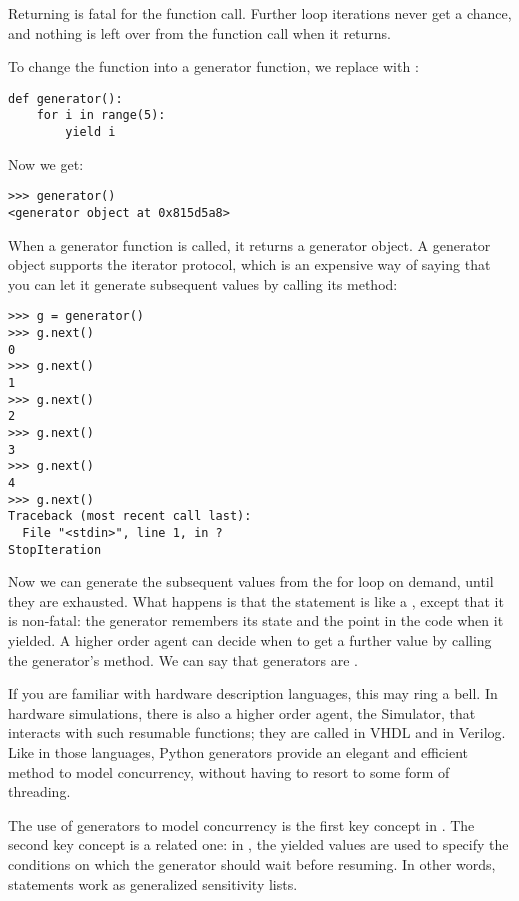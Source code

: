Returning is fatal for the function call. Further loop iterations
never get a chance, and nothing is left over from the function call
when it returns.

To change the function into a generator function, we replace
 with :

\begin{verbatim}
def generator():
    for i in range(5):
        yield i
\end{verbatim}

Now we get:

\begin{verbatim}
>>> generator()
<generator object at 0x815d5a8>
\end{verbatim}

When a generator function is called, it returns a generator object. A
generator object supports the iterator protocol, which is an expensive
way of saying that you can let it generate subsequent values by
calling its  method:

\begin{verbatim}
>>> g = generator()
>>> g.next()
0
>>> g.next()
1
>>> g.next()
2
>>> g.next()
3
>>> g.next()
4
>>> g.next()
Traceback (most recent call last):
  File "<stdin>", line 1, in ?
StopIteration
\end{verbatim}

Now we can generate the subsequent values from the for loop on demand,
until they are exhausted. What happens is that the
 statement is like a
, except that it is non-fatal: the generator remembers
its state and the point in the code when it yielded. A higher order
agent can decide when to get a further value by calling the
generator's  method. We can say that generators are
.

If you are familiar with hardware description languages, this may ring
a bell. In hardware simulations, there is also a higher order agent,
the Simulator, that interacts with such resumable functions; they are
called 
%
 in VHDL and 
%
 in
Verilog. Like in those languages, Python generators provide an elegant
and efficient method to model concurrency, without having to resort to
some form of threading.

The use of generators to model concurrency is the first key concept in
\myhdl{}. The second key concept is a related one: in \myhdl{}, the
yielded values are used to specify the conditions on which the
generator should wait before resuming. In other words, 
statements work as generalized 
sensitivity lists. 

